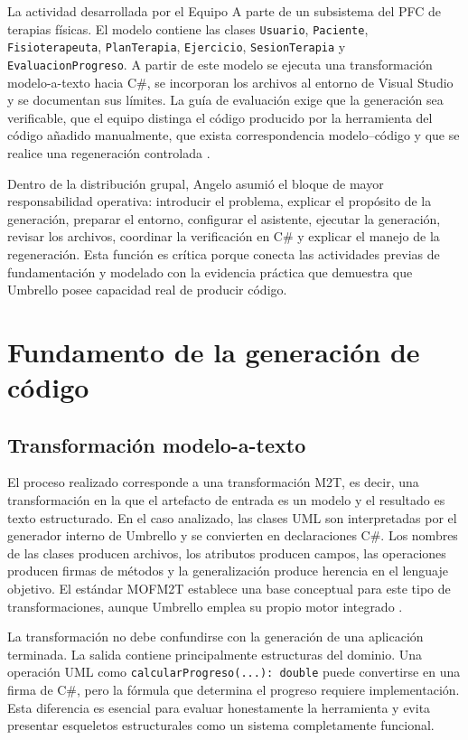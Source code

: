 La actividad desarrollada por el Equipo A parte de un subsistema del PFC de terapias físicas. El modelo contiene las clases \texttt{Usuario}, \texttt{Paciente}, \texttt{Fisioterapeuta}, \texttt{PlanTerapia}, \texttt{Ejercicio}, \texttt{SesionTerapia} y \texttt{EvaluacionProgreso}. A partir de este modelo se ejecuta una transformación modelo-a-texto hacia C\#, se incorporan los archivos al entorno de Visual Studio y se documentan sus límites. La guía de evaluación exige que la generación sea verificable, que el equipo distinga el código producido por la herramienta del código añadido manualmente, que exista correspondencia modelo--código y que se realice una regeneración controlada \cite{GuiaMDD2026}.

Dentro de la distribución grupal, Angelo asumió el bloque de mayor responsabilidad operativa: introducir el problema, explicar el propósito de la generación, preparar el entorno, configurar el asistente, ejecutar la generación, revisar los archivos, coordinar la verificación en C\# y explicar el manejo de la regeneración. Esta función es crítica porque conecta las actividades previas de fundamentación y modelado con la evidencia práctica que demuestra que Umbrello posee capacidad real de producir código.

\section{Fundamento de la generación de código}
\subsection{Transformación modelo-a-texto}
El proceso realizado corresponde a una transformación M2T, es decir, una transformación en la que el artefacto de entrada es un modelo y el resultado es texto estructurado. En el caso analizado, las clases UML son interpretadas por el generador interno de Umbrello y se convierten en declaraciones C\#. Los nombres de las clases producen archivos, los atributos producen campos, las operaciones producen firmas de métodos y la generalización produce herencia en el lenguaje objetivo. El estándar MOFM2T establece una base conceptual para este tipo de transformaciones, aunque Umbrello emplea su propio motor integrado \cite{OMG2008MOFM2T,KDEUmbrelloCodegen}.

La transformación no debe confundirse con la generación de una aplicación terminada. La salida contiene principalmente estructuras del dominio. Una operación UML como \texttt{calcularProgreso(...): double} puede convertirse en una firma de C\#, pero la fórmula que determina el progreso requiere implementación. Esta diferencia es esencial para evaluar honestamente la herramienta y evita presentar esqueletos estructurales como un sistema completamente funcional.

